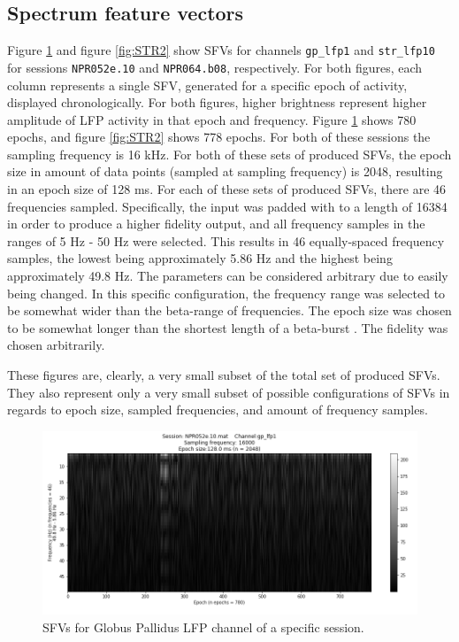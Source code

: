 \documentclass{article}
\begin{document}
\subsection{Spectrum feature vectors}\label{SFV Results}

Figure \ref{fig:GP1} and figure \ref{fig:STR2} show SFVs for channels \texttt{gp\_lfp1} and \texttt{str\_lfp10} for sessions \texttt{NPR052e.10} and \texttt{NPR064.b08}, respectively. 
For both figures, each column represents a single SFV, generated for a specific epoch of activity, displayed chronologically. 
For both figures, higher brightness represent higher amplitude of LFP activity in that epoch and frequency.
Figure \ref{fig:GP1} shows 780 epochs, and figure \ref{fig:STR2} shows 778 epochs. 
For both of these sessions the sampling frequency is 16 kHz. 
For both of these sets of produced SFVs, the epoch size in amount of data points (sampled at sampling frequency) is 2048, resulting in an epoch size of 128 ms. 
For each of these sets of produced SFVs, there are 46 frequencies sampled. 
Specifically, the input was padded with to a length of 16384 in order to produce a higher fidelity output, and all frequency samples in the ranges of 5 Hz - 50 Hz were selected. 
This results in 46 equally-spaced frequency samples, the lowest being approximately 5.86 Hz and the highest being approximately 49.8 Hz. 
The parameters can be considered arbitrary due to easily being changed.
In this specific configuration, the frequency range was selected to be somewhat wider than the beta-range of frequencies.
The epoch size was chosen to be somewhat longer than the shortest length of a beta-burst \citep{Cagnan}.
The fidelity was chosen arbitrarily.

These figures are, clearly, a very small subset of the total set of produced SFVs. They also represent only a very small subset of possible configurations of SFVs in regards to epoch size, sampled frequencies, and amount of frequency samples.

\begin{figure}[H]
    \centering
    \centerline{\includegraphics[width=1\textwidth]{images/GP1.png}}
    \caption{SFVs for Globus Pallidus LFP channel of a specific session.}
    \label{fig:GP1}
\end{figure}
\end{document}
